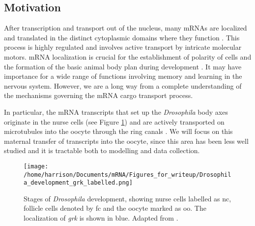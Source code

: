\documentclass[twocolumn]{biophys}
\begin{document}

\subsection{Motivation}
After transcription and transport out of the nucleus, many mRNAs are localized and translated in the distinct cytoplasmic domains where they function \citep{jansen2001mrna, parton2014subcellular}.
This process is highly regulated and involves active transport by intricate molecular motors.
mRNA localization is crucial for the establishment of polarity of cells and the formation of the basic animal body plan during development \citep{wolpert1998}. 
It may have importance for a wide range of functions involving memory and learning in the nervous system. 
However, we are a long way from a complete understanding of the mechanisms governing the mRNA cargo transport process.

In particular, the mRNA transcripts that set up the \textit{Drosophila} body axes originate in the nurse cells (see Figure \ref{FIG:Drosophila_development}) and are actively transported on microtubules into the oocyte through the ring canals \citep{clark2007dynein}.
We will focus on this maternal transfer of transcripts into the oocyte, since this area has been less well studied and it is tractable both to modelling and data collection.
\begin{figure}[h]
 \centering
 \texttt{[image: /home/harrison/Documents/mRNA/Figures\_for\_writeup/Drosophila\_development\_grk\_labelled.png]}
 \caption{\small Stages of \textit{Drosophila} development, showing nurse cells labelled as nc, follicle cells denoted by fc and the oocyte marked as oo. The localization of \textit{grk} is shown in blue. Adapted from \citet{lasko1999rna}.}
 \label{FIG:Drosophila_development}
\end{figure}
\end{document}

